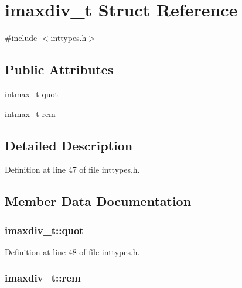 \hypertarget{structimaxdiv__t}{}\section{imaxdiv\+\_\+t Struct Reference}
\label{structimaxdiv__t}


{\ttfamily \#include $<$inttypes.\+h$>$}

\subsection*{Public Attributes}
\begin{DoxyCompactItemize}
\item 
\hyperlink{lib-src_2ffmpeg_2win32_2stdint_8h_a036cd61bb4b30bb510b9538af4cebd1d}{intmax\+\_\+t} \hyperlink{structimaxdiv__t_a9339814cbb7610c72fb7d30c6573b393}{quot}
\item 
\hyperlink{lib-src_2ffmpeg_2win32_2stdint_8h_a036cd61bb4b30bb510b9538af4cebd1d}{intmax\+\_\+t} \hyperlink{structimaxdiv__t_a6c9701ad10bff81edae7ff679cae7850}{rem}
\end{DoxyCompactItemize}


\subsection{Detailed Description}


Definition at line 47 of file inttypes.\+h.



\subsection{Member Data Documentation}
\subsubsection[{\texorpdfstring{quot}{quot}}]{ imaxdiv\+\_\+t\+::quot}\hypertarget{structimaxdiv__t_a9339814cbb7610c72fb7d30c6573b393}{}\label{structimaxdiv__t_a9339814cbb7610c72fb7d30c6573b393}


Definition at line 48 of file inttypes.\+h.

\subsubsection[{\texorpdfstring{rem}{rem}}]{ imaxdiv\+\_\+t\+::rem}\hypertarget{structimaxdiv__t_a6c9701ad10bff81edae7ff679cae7850}{}\label{structimaxdiv__t_a6c9701ad10bff81edae7ff679cae7850}



